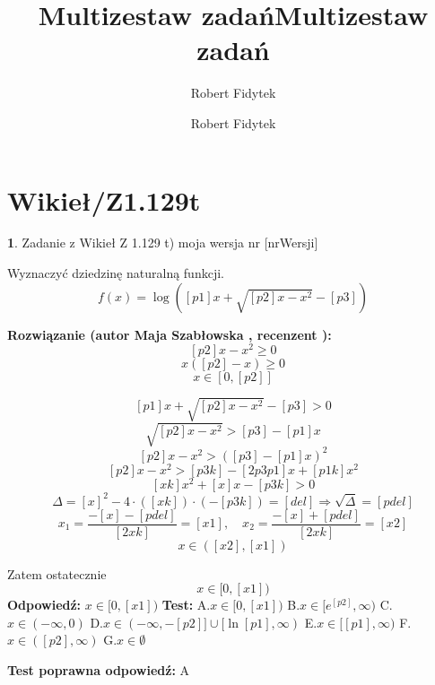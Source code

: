 \documentclass[12pt, a4paper]{article}
\title{Multizestaw zadań}
\author{Robert Fidytek}
\date{}\documentclass[12pt, a4paper]{article}
\title{Multizestaw zadań}
\author{Robert Fidytek}
\date{}
\theoremstyle{definition} %
\newtheorem{zad}{}
\theoremstyle{definition} %
\newtheorem{zad}{}
\newcommand{\kategoria}[1]{\section{#1}} %
\newcommand{\zadStart}[1]{\begin{zad}#1\newline} %
\newcommand{\zadStop}{\end{zad}}   %
\newcommand{\rozwStart}[2]{\noindent \textbf{Rozwiązanie (autor #1 , recenzent #2): }\newline} %
\newcommand{\rozwStop}{\newline}                                            %
\newcommand{\odpStart}{\noindent \textbf{Odpowiedź:}\newline}    %
\newcommand{\odpStop}{\newline}                                             %
\newcommand{\testStart}{\noindent \textbf{Test:}\newline} %
\newcommand{\testStop}{\newline} %
\newcommand{\kluczStart}{\noindent \textbf{Test poprawna odpowiedź:}\newline} %
\newcommand{\kluczStop}{\newline} %
\begin{document}
\maketitle


\kategoria{Wikieł/Z1.129t}
\zadStart{Zadanie z Wikieł Z 1.129 t) moja wersja nr [nrWersji]}

Wyznaczyć dziedzinę naturalną funkcji.
$$f(x)=\log \left([p1]x+\sqrt{[p2]x-x^{2}}-[p3]\right)$$
\zadStop

\rozwStart{Maja Szabłowska}{}
$$[p2]x-x^{2}\geq 0$$
$$x([p2]-x)\geq 0$$
$$x\in[0,[p2]]$$

$$[p1]x+\sqrt{[p2]x-x^{2}}-[p3]>0$$
$$\sqrt{[p2]x-x^{2}}>[p3]-[p1]x$$
$$[p2]x-x^{2}>([p3]-[p1]x)^{2}$$
$$[p2]x-x^{2}>[p3k]-[2p3p1]x+[p1k]x^{2} $$
$$[xk]x^{2}+[x]x-[p3k]>0$$
$$\Delta=[x]^{2}-4\cdot([xk])\cdot(-[p3k])=[del] \Rightarrow \sqrt{\Delta}=[pdel]$$
$$x_{1}=\frac{-[x]-[pdel]}{[2xk]}=[x1], \quad x_{2}=\frac{-[x]+[pdel]}{[2xk]}=[x2]$$
$$x\in([x2], [x1])$$

Zatem ostatecznie 
$$x\in[0,[x1])$$
\rozwStop
\odpStart
$x\in[0,[x1])$
\odpStop
\testStart
A.$x\in[0,[x1])$
B.$x\in[e^{[p2]},\infty)$
C.$x\in(-\infty, 0)$
D.$x\in(-\infty, -[p2]] \cup [\ln[p1],\infty)$
E.$x\in[[p1],\infty)$
F.$x\in([p2],\infty)$
G.$x\in\emptyset$

\testStop
\kluczStart
A
\kluczStop
\end{document}
